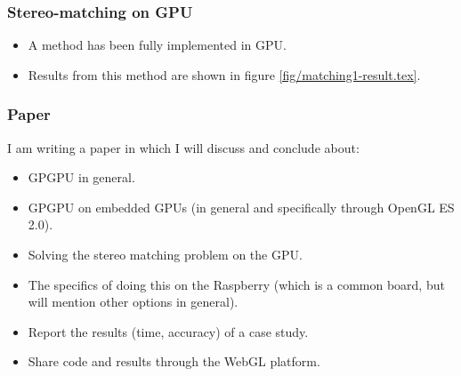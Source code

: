 




\subsubsection{Stereo-matching on GPU}
\begin{itemize}
	\item A method has been fully implemented in GPU.
	\item Results from this method are shown in figure \ref{fig/matching1-result.tex}.
\end{itemize}

\subsubsection{Paper}

I am writing a paper in which I will discuss and conclude about:
\begin{itemize}
	\item GPGPU in general.
	\item GPGPU on embedded GPUs (in general and specifically through OpenGL ES 2.0).
	\item Solving the stereo matching problem on the GPU.
	\item The specifics of doing this on the Raspberry (which is a common board, but will mention other options in general).
	\item Report the results (time, accuracy) of a case study.
	\item Share code and results through the WebGL platform.
\end{itemize}
